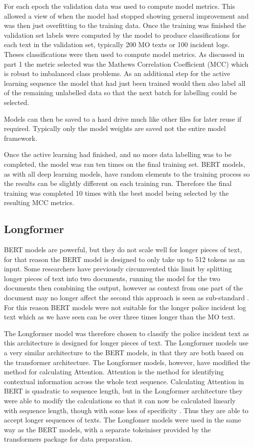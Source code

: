For each epoch the validation data was used to compute model metrics. This allowed a view of when the model had stopped showing general improvement and was then just overfitting to the training data. Once the training was finished the validation set labels were computed by the model to produce classifications for each text in the validation set, typically 200 MO texts or 100 incident logs. Theses classifications were then used to compute model metrics. As discussed in part 1 the metric selected was the Mathews Correlation Coefficient (MCC) which is robust to imbalanced class problems. As an additional step for the active learning sequence the model that had just been trained would then also label all of the remaining unlabelled data so that the next batch for labelling could be selected.

Models can then be saved to a hard drive much like other files for later reuse if required. Typically only the model weights are saved not the entire model framework. 

Once the active learning had finished, and no more data labelling was to be completed, the model was ran ten times on the final training set. BERT models, as with all deep learning models, have random elements to the training process so the results can be slightly different on each training run. Therefore the final training was completed 10 times with the best model being selected by the resulting MCC metrics. 

\subsection{Longformer} BERT models are powerful, but they do not scale well for longer pieces of text, for that reason the BERT model is designed to only take up to 512 tokens as an input. Some researchers have previously circumvented this limit by splitting longer pieces of text into two documents, running the model for the two documents then combining the output, however as context from one part of the document may no longer affect the second this approach is seen as sub-standard \parencite{Longformer}. For this reason BERT models were not suitable for the longer police incident log text which as we have seen can be over three times longer than the MO text. 

The Longformer model \parencite{Longformer} was therefore chosen to classify the police incident text as this architecture is designed for longer pieces of text. The Longformer models use a very similar architecture to the BERT models, in that they are both based on the transformer architecture. The Longformer models, however, have modified the method for calculating Attention. Attention is the method for identifying contextual information across the whole text sequence. Calculating Attention in BERT is quadratic to sequence length, but in the Longformer architecture they were able to modify the calculations so that it can now be calculated linearly with sequence length, though with some loss of specificity \parencite{Longformer}. Thus they are able to accept longer sequences of texts. The Longfomer models were used in the same way as the BERT models, with a separate tokeiniser provided by the transformers package for data preparation.

